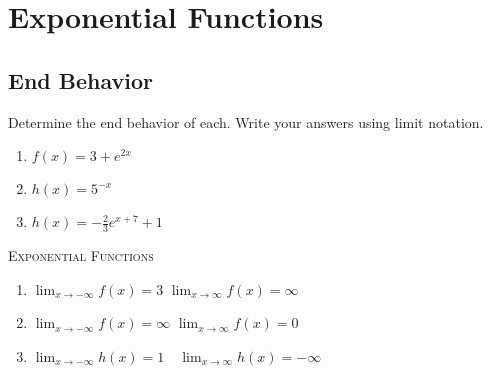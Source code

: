 \chapter{Exponential Functions}

\section{End Behavior}

Determine the end behavior of each. Write your answers using limit notation.
\begin{enumerate}
	\item $f(x) = 3 + e^{2x}$
	\item $h(x) = 5^{-x}$
	\item $h(x) = -\frac{2}{3}e^{x+7} + 1$
\end{enumerate}

\newpage

\textsc{Exponential Functions}

\begin{enumerate}
	\item $\lim_{x \to -\infty} f(x) = 3$ \quad $\lim_{x \to \infty} f(x) = \infty$
	\item $\lim_{x \to -\infty} f(x) = \infty$ \quad $\lim_{x \to \infty} f(x) =0$ 
	\item $\lim_{x \to -\infty} h(x) = 1 \quad \lim_{x \to \infty} h(x) = - \infty$
\end{enumerate}

